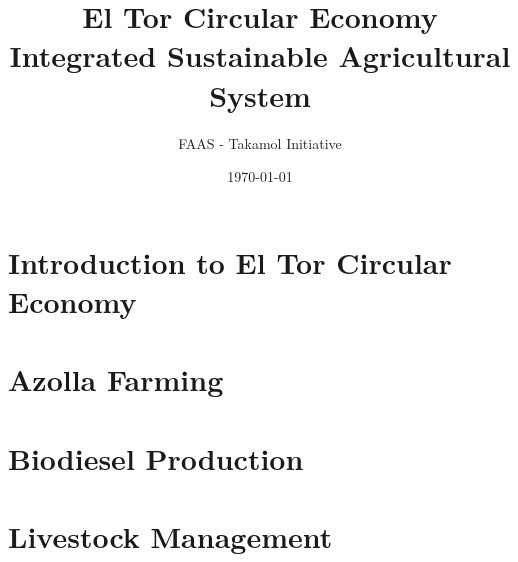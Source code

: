 \documentclass[12pt,a4paper]{report}
\title{El Tor Circular Economy\\
\large Integrated Sustainable Agricultural System}
\author{FAAS - Takamol Initiative}
\date{\today}
\begin{document}
\maketitle

\frontmatter
\tableofcontents
\clearpage

\mainmatter

\chapter{Introduction to El Tor Circular Economy}


\chapter{Azolla Farming}









\chapter{Biodiesel Production}









\chapter{Livestock Management}








\end{document}
